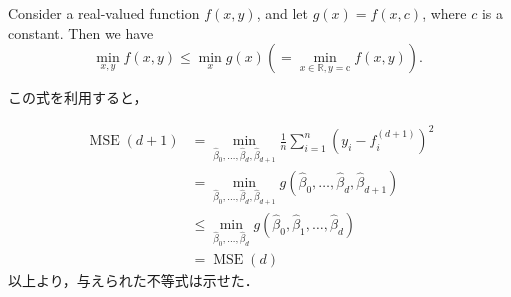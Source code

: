 \documentclass[dvipdfmx]{ujarticle}
\begin{document}
\begin{shadebox}
Consider a real-valued function $f(x, y)$, and let $g(x)=f(x, c)$, where $c$ is a constant. Then we have
\begin{equation}
  \min _{x, y} f(x, y) \le \min _{x} g(x)\left(=\min _{x \in \mathbb{R}, y=\mathrm{c}} f(x, y)\right) \text {. }
\end{equation}
\end{shadebox}

この式を利用すると，

\begin{equation}
  \begin{aligned}
    \operatorname{MSE}(d+1) &= \min _{\widehat{\beta}_{0}, \ldots, \widehat{\beta}_{d} ,\widehat{\beta}_{d+1}} \frac{1}{n} \sum_{i=1}^{n}\left(y_{i}-f_{i}^{(d+1)}\right)^{2} \\
    &= \min _{\widehat{\beta}_{0}, \ldots, \widehat{\beta}_{d} ,\widehat{\beta}_{d+1}} g({\widehat{\beta}_{0}, \ldots, \widehat{\beta}_{d} ,\widehat{\beta}_{d+1}}) \\
    &\le \min _{\widehat{\beta}_{0}, \ldots, \widehat{\beta}_{d}} g(\widehat{\beta}_{0}, \widehat{\beta}_{1}, \ldots, \widehat{\beta}_{d}) \\
    &=\operatorname{MSE}(d)
  \end{aligned}
\end{equation}
以上より，与えられた不等式は示せた．
\end{document}

